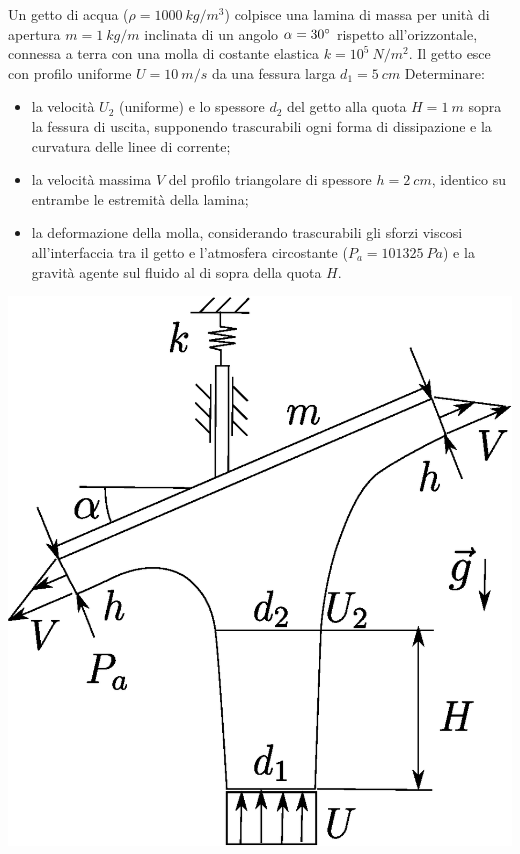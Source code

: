 \begin{minipage}[l]{0.5\textwidth}
  \begin{exerciseS}
 Un getto di acqua ($\rho = 1000 \ kg/m^3$) colpisce una lamina
 di massa per unità di apertura $m = 1 \ kg/m$ inclinata di un 
 angolo $\alpha = 30\degree$ rispetto all'orizzontale, connessa a terra
 con una molla di costante elastica $k = 10^5 \ N/m^2$. 
 Il getto esce con profilo uniforme $U=10 \ m/s$ da una fessura
 larga $d_1 = 5 \ cm$
 Determinare:
 \begin{itemize}
   \item la velocità $U_2$ (uniforme) e lo spessore $d_2$ del getto
     alla quota $H=1 \ m$ sopra la fessura di uscita, supponendo 
     trascurabili ogni forma di dissipazione e la curvatura delle 
     linee di corrente;
   \item la velocità massima $V$ del profilo triangolare di spessore
     $h = 2 \ cm$, identico su entrambe le estremità della lamina;
   \item la deformazione della molla, considerando trascurabili gli 
     sforzi viscosi all'interfaccia tra il getto e l'atmosfera 
     circostante ($P_a = 101325 \ Pa$) e la
     gravità agente sul fluido al di sopra della quota $H$.
 \end{itemize}
 \end{exerciseS}

\end{minipage}
\hspace{3mm}
\begin{minipage}[r]{0.5\textwidth}
 \centering
  \includegraphics[width=1.0\textwidth]{./fig/jet_angle}
\end{minipage}

